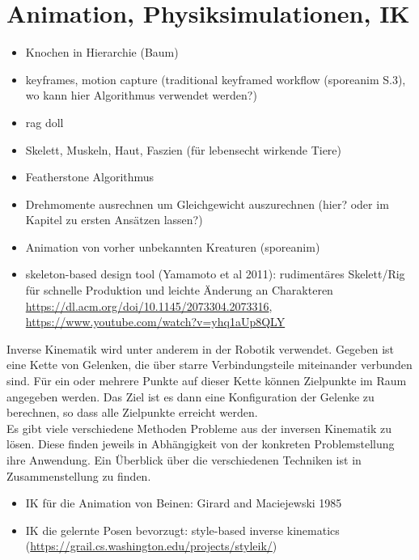 

\section{Animation, Physiksimulationen, IK}

\begin{itemize}
 \item Knochen in Hierarchie (Baum)
 \item keyframes, motion capture (traditional keyframed workflow (sporeanim S.3), wo kann hier Algorithmus verwendet werden?)
 \item rag doll
 \item Skelett, Muskeln, Haut, Faszien (für lebensecht wirkende Tiere)
 \item Featherstone Algorithmus
 \item Drehmomente ausrechnen um Gleichgewicht auszurechnen (hier? oder im Kapitel zu ersten Ansätzen lassen?)
 \item Animation von vorher unbekannten Kreaturen (sporeanim)
 \item skeleton-based design tool (Yamamoto et al 2011): rudimentäres Skelett/Rig für schnelle Produktion und leichte Änderung an Charakteren
        \url{https://dl.acm.org/doi/10.1145/2073304.2073316}, \url{https://www.youtube.com/watch?v=yhq1aUp8QLY}
\end{itemize}

Inverse Kinematik wird unter anderem in der Robotik verwendet. Gegeben ist eine Kette von Gelenken, die über starre Verbindungsteile miteinander verbunden sind. Für ein oder mehrere Punkte auf dieser Kette können Zielpunkte im Raum angegeben werden. Das Ziel ist es dann eine Konfiguration der Gelenke zu berechnen, so dass alle Zielpunkte erreicht werden.\\
Es gibt viele verschiedene Methoden Probleme aus der inversen Kinematik zu lösen. Diese finden jeweils in Abhängigkeit von der konkreten Problemstellung ihre Anwendung. Ein Überblick über die verschiedenen Techniken ist in Zusammenstellung \cite{IKSurvey} zu finden.

\begin{itemize}
 \item IK für die Animation von Beinen: Girard and Maciejewski 1985
 \item IK die gelernte Posen bevorzugt: style-based inverse kinematics (\url{https://grail.cs.washington.edu/projects/styleik/})
\end{itemize}



